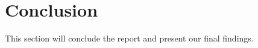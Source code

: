 \documentclass[../document.tex]{subfiles}
\begin{document}
\section*{Conclusion}

This section will conclude the report and present our final findings.
\end{document}
